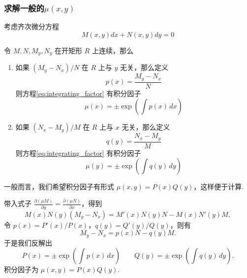 \subsubsection{求解一般的\texorpdfstring{$\mu(x,y)$}{mu(x,y)}}

考虑齐次微分方程
\begin{equation}\label{eq:integrating_factor}
    M(x,y)dx+N(x,y)dy=0
\end{equation}

\begin{theorem}\label{thm:integrating_factor}
    令 $M,N,M_y,N_y$ 在开矩形 $R$ 上连续，那么
    \begin{enumerate}
        \item 如果 $(M_y-N_x)/N$ 在 $R$ 上与 $y$ 无关，那么定义
              $$p(x)=\frac{M_y-N_x}{N}$$
              则方程\ref{eq:integrating_factor} 有积分因子
              \begin{equation}\label{eq:integrating_factor_1}
                  \mu(x)=\pm \exp\left( \int p(x) \, dx \right)
              \end{equation}
        \item 如果 $(N_x-M_y)/M$ 在 $R$ 上与 $x$ 无关，那么定义
              $$q(y)=\frac{N_x-M_y}{M}$$
              则方程\ref{eq:integrating_factor} 有积分因子
              \begin{equation}\label{eq:integrating_factor_2}
                  \mu(y)=\pm \exp\left( \int q(y) \, dy \right)
              \end{equation}
    \end{enumerate}
\end{theorem}

一般而言，我们希望积分因子有形式 $\mu(x,y)=P(x)Q(y)$，这样便于计算. 

带入式子 $\displaystyle \frac{ \partial (\mu M) }{ \partial y }=\frac{ \partial (\mu N) }{ \partial x }$，得到
\begin{equation}\label{eq:integrating_factor_3}
    M(x) N(y)\left(M_y-N_x\right)=M'(x) N(y) N-M(x) N'(y) M,
\end{equation}
令 $p(x)=P'(x)/P(x)$，$q(y)=Q'(y)/Q(y)$，则有
\begin{equation}\label{eq:integrating_factor_4}
    M_y-N_x=p(x)N-q(y)M.
\end{equation}
于是我们反解出
\begin{equation}\label{eq:integrating_factor_5}
    P(x)=\pm \exp\left( \int p(x) \, dx \right)\qquad Q(y)=\pm\exp\left( \int q(y) \, dy \right).
\end{equation}
积分因子为 $\mu(x,y)=P(x)Q(y)$.

